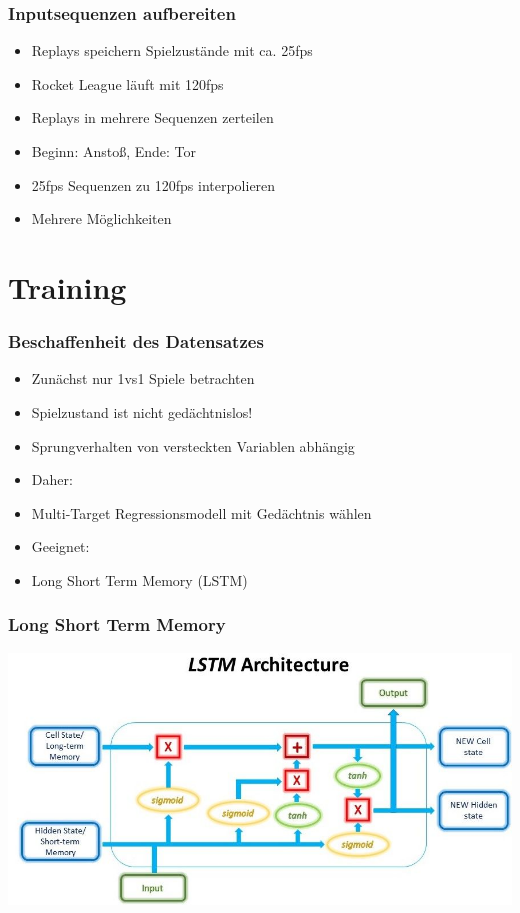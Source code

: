 \documentclass{beamer}
\begin{document}
 \begin{frame}
 \frametitle{Inputsequenzen aufbereiten}
\begin{itemize}
 \item Replays speichern Spielzustände mit ca. 25fps
 \item Rocket League läuft mit 120fps
 \item Replays in mehrere Sequenzen zerteilen
 \item Beginn: Anstoß, Ende: Tor
 \item 25fps Sequenzen zu 120fps interpolieren
 \item Mehrere Möglichkeiten
\end{itemize}
 \end{frame}

 \section{Training}

 \begin{frame}
 \frametitle{Beschaffenheit des Datensatzes}
  \begin{itemize}
   \item Zunächst nur 1vs1 Spiele betrachten
   \item Spielzustand ist nicht gedächtnislos!
   \item Sprungverhalten von versteckten Variablen abhängig
   \item Daher:
   \item Multi-Target Regressionsmodell mit Gedächtnis wählen
   \item Geeignet:
   \item Long Short Term Memory (LSTM)
  \end{itemize}
 \end{frame}


 \begin{frame}
 \frametitle{Long Short Term Memory}
 \includegraphics[width=\textwidth]{LSTM.JPG}
 \end{frame}
\end{document}
